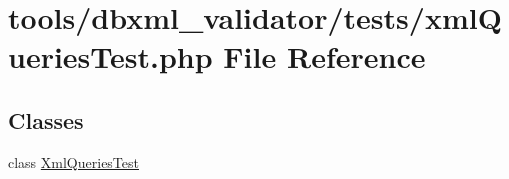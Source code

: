 \hypertarget{xmlQueriesTest_8php}{\section{tools/dbxml\+\_\+validator/tests/xml\+Queries\+Test.php File Reference}
\label{xmlQueriesTest_8php}
}
\subsection*{Classes}
\begin{DoxyCompactItemize}
\item 
class \hyperlink{classXmlQueriesTest}{Xml\+Queries\+Test}
\end{DoxyCompactItemize}
